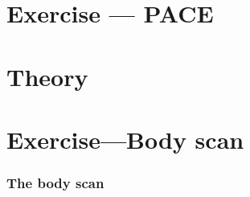 \documentclass{beamer}
\begin{document}

\section{Exercise --- PACE}



\section{Theory}


\section{Exercise---Body scan}

\begin{frame}
  \frametitle{The body scan}
\end{frame}



\end{document}
